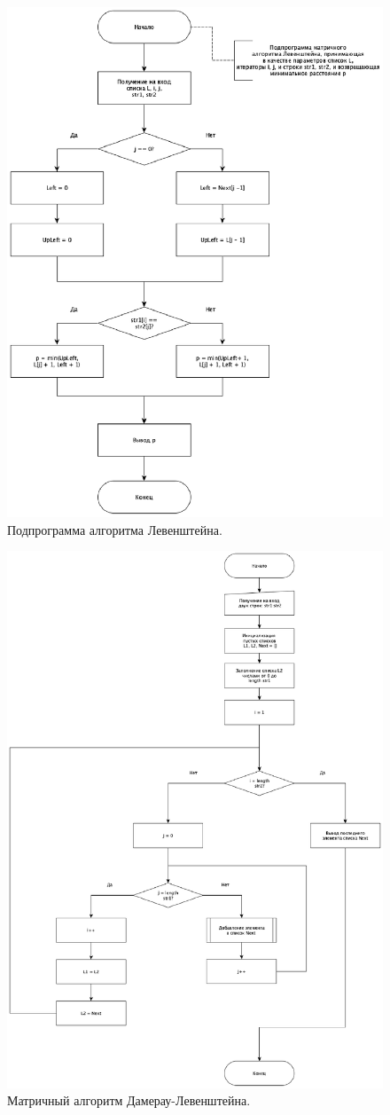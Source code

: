 \documentclass[12pt]{report}
\begin{document}
	\begin{figure}[h!]
		\centering
		\includegraphics[width=0.8\linewidth]{LevenM_sub}
		\caption{Подпрограмма алгоритма Левенштейна.}
		\label{ris:image5}
	\end{figure}
	    
    \newpage
    
    \begin{figure}[h!]
    	\centering
    	\includegraphics[width=0.8\linewidth]{LevenDomerauM}
    	\caption{Матричный алгоритм Дамерау-Левенштейна.}
    	\label{ris:image6}
    \end{figure}
\end{document}
